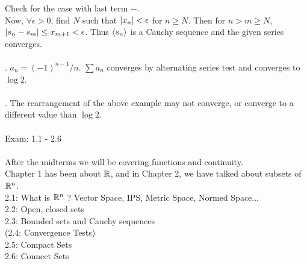 Check for the case with last term $-$.\\
Now, $\forall\epsilon>0$, find $N$ such that $\left|x_n\right|<\epsilon$ for $n\geq N$. Then for $n> m\geq N$, $\left|s_n-s_m\right| \leq x_{m+1} < \epsilon$. Thus $\left\langle s_n \right\rangle$ is a Cauchy sequence and the given series converges.\\
\\
\ex. $a_n = (-1)^{n-1}/n$. $\sum a_n$ converges by alternating series test and converges to $\log 2$.\\
\\
\rmk. The rearrangement of the above example may not converge, or converge to a different value than $\log 2$.\\
\\
Exam: 1.1 - 2.6\\
\\
After the midterms we will be covering functions and continuity.\\
Chapter 1 has been about $\mathbb{R}$, and in Chapter 2, we have talked about subsets of $\mathbb{R}^n$.\\
2.1: What is $\mathbb{R}^n$ ? Vector Space, IPS, Metric Space, Normed Space...\\
2.2: Open, closed sets\\
2.3: Bounded sets and Cauchy sequences\\
(2.4: Convergence Tests)\\
2.5: Compact Sets\\
2.6: Connect Sets\\



\pagebreak